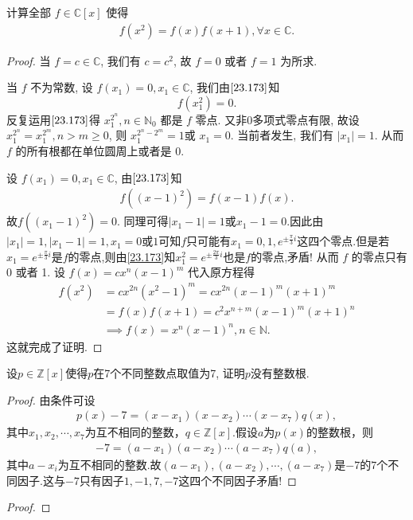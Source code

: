 \documentclass[../../main.tex]{subfiles}
\begin{document}
\begin{example}
计算全部 \( f \in \mathbb{C}[x] \) 使得
\begin{align}
f(x^2) = f(x)f(x+1), \forall x \in \mathbb{C}. \label{23.173}
\end{align}
\end{example}
\begin{proof}
当 \( f = c \in \mathbb{C} \), 我们有 \( c = c^2 \), 故 \( f = 0 \) 或者 \( f = 1 \) 为所求.

当 \( f \) 不为常数, 设 \( f(x_1) = 0, x_1 \in \mathbb{C} \), 我们由\(\eqref{23.173}\)知
\[
f(x_1^2) = 0.
\]
反复运用\(\eqref{23.173}\)得 \( x_1^{2^n}, n \in \mathbb{N}_0 \) 都是 \( f \) 零点. 又非0多项式零点有限, 故设 \( x_1^{2^n} = x_1^{2^m}, n > m \geq 0 \), 则 \( x_1^{2^n - 2^m} = 1 \)或 \( x_1 = 0 \). 当前者发生, 我们有 \( |x_1| = 1 \). 从而 \( f \) 的所有根都在单位圆周上或者是 0.

设 \( f(x_1) = 0, x_1 \in \mathbb{C} \), 由\(\eqref{23.173}\)知 
\begin{align*}
f((x-1)^2)=f(x-1)f(x).
\end{align*}
故\( f\left( (x_1 - 1)^2 \right) = 0 \). 同理可得\( |x_1 - 1| = 1 \)或$x_1-1=0$.因此由$|x_1|=1,|x_1-1|=1,x_1=0\text{或}1$可知$f$只可能有$x_1=0,1,e^{\pm \frac{\pi}{3}i} $这四个零点.但是若$x_1=e^{\pm \frac{\pi}{3}i}$是$f$的零点,则由\eqref{23.173}知$x_1^2=e^{\pm \frac{2\pi}{3}i}$也是$f$的零点,矛盾!
从而 \( f \) 的零点只有 0 或者 1. 设 \( f(x) = cx^n(x - 1)^m \) 代入原方程得
\begin{align*}
f(x^2) &= cx^{2n}(x^2 - 1)^m = cx^{2n}(x - 1)^m(x + 1)^m \\
&= f(x)f(x+1) = c^2x^{n+m}(x - 1)^m(x + 1)^n \\
&\implies f(x) = x^n(x - 1)^n, n \in \mathbb{N}.
\end{align*}
这就完成了证明.

\end{proof}

\begin{example}
设$ p \in \mathbb{Z}[x] $使得$ p $在7个不同整数点取值为7, 证明$ p $没有整数根.
\end{example}
\begin{proof}
由条件可设
\begin{align*}
p\left( x \right) -7=\left( x-x_1 \right) \left( x-x_2 \right) \cdots \left( x-x_7 \right) q\left( x \right),
\end{align*}
其中$x_1,x_2,\cdots,x_7$为互不相同的整数，$q\in \mathbb{Z}[x]$.假设$a$为$p\left( x \right)$的整数根，则
\begin{align*}
-7=\left( a-x_1 \right) \left( a-x_2 \right) \cdots \left( a-x_7 \right) q\left( a \right),
\end{align*}
其中$a-x_i$为互不相同的整数.故$\left( a-x_1 \right),\left( a-x_2 \right),\cdots,\left( a-x_7 \right)$是$-7$的$7$个不同因子.这与$-7$只有因子$1,-1,7,-7$这四个不同因子矛盾!

\end{proof}

\begin{example}

\end{example}
\begin{proof}


\end{proof}
\end{document}
